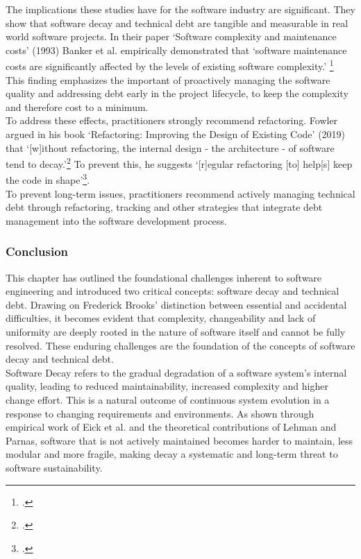 The implications these studies have for the software industry are significant. They show that software decay and technical debt are tangible and measurable in real world software projects.
In their paper `Software complexity and maintenance costs' (1993) Banker et al. empirically demonstrated that `software maintenance costs are significantly affected by the levels of existing software complexity.' \footcite[12]{bankerSoftwareComplexityMaintenance1993}
This finding emphasizes the important of proactively managing the software quality and addressing debt early in the project lifecycle, to keep the complexity and therefore cost to a minimum.\\
To address these effects, practitioners strongly recommend refactoring. Fowler argued in his book `Refactoring: Improving the Design of Existing Code' (2019)
that `[w]ithout refactoring, the internal design - the architecture - of software tend to decay.'\footcite[58]{fowlerRefactoringImprovingDesign2019}
To prevent this, he suggests `[r]egular refactoring [to] help[s] keep the code in shape'\footcite[58]{fowlerRefactoringImprovingDesign2019}.\\
To prevent long-term issues, practitioners recommend actively managing technical debt through refactoring, tracking and other strategies 
that integrate debt management into the software development process.\\

\subsubsection{Conclusion}

This chapter has outlined the foundational challenges inherent to software engineering and introduced two critical concepts: software decay and technical debt.
Drawing on Frederick Brooks' distinction between essential and accidental difficulties, it becomes evident that complexity, changeability and lack of uniformity are deeply rooted in the nature of software itself and cannot be fully resolved.
These enduring challenges are the foundation of the concepts of software decay and technical debt.\\

Software Decay refers to the gradual degradation of a software system's internal quality, leading to reduced maintainability, increased complexity and higher change effort. This is a natural outcome of continuous system evolution in a response to changing requirements and environments.
As shown through empirical work of Eick et al. and the theoretical contributions of Lehman and Parnas, software that is not actively maintained becomes harder to maintain, less modular and more fragile, making decay a systematic and long-term threat to software sustainability.\\

